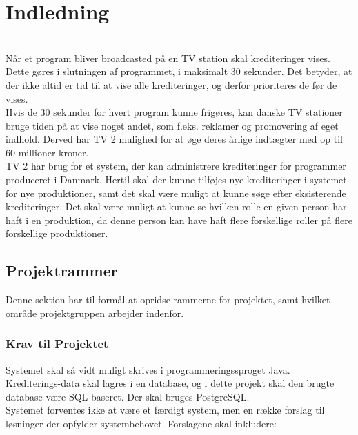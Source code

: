 \section{Indledning}

\\

Når et program bliver broadcasted på en TV station skal krediteringer vises. Dette gøres i slutningen af programmet, i maksimalt 30 sekunder. Det betyder, at der ikke altid er tid til at vise alle krediteringer, og derfor prioriteres de før de vises. \\
Hvis de 30 sekunder for hvert program kunne frigøres, kan danske TV stationer bruge tiden på at vise noget andet, som f.eks. reklamer og promovering af eget indhold. Derved har TV 2 mulighed for at øge deres årlige indtægter med op til 60 millioner kroner. \\
TV 2 har brug for et system, der kan administrere krediteringer for programmer produceret i Danmark. Hertil skal der kunne tilføjes nye krediteringer i systemet for nye produktioner, samt det skal være muligt at kunne søge efter eksisterende krediteringer. Det skal være muligt at kunne se hvilken rolle en given person har haft i en produktion, da denne person kan have haft flere forskellige roller på flere forskellige produktioner.

\subsection{Projektrammer}
Denne sektion har til formål at opridse rammerne for projektet, samt hvilket område projektgruppen arbejder indenfor.

\subsubsection{Krav til Projektet}
Systemet skal så vidt muligt skrives i programmeringssproget Java. \\
Krediterings-data skal lagres i en database, og i dette projekt skal den brugte database være SQL baseret. Der skal bruges PostgreSQL.\\
Systemet forventes ikke at være et færdigt system, men en række forslag til løsninger der opfylder systembehovet. Forslagene skal inkludere:

